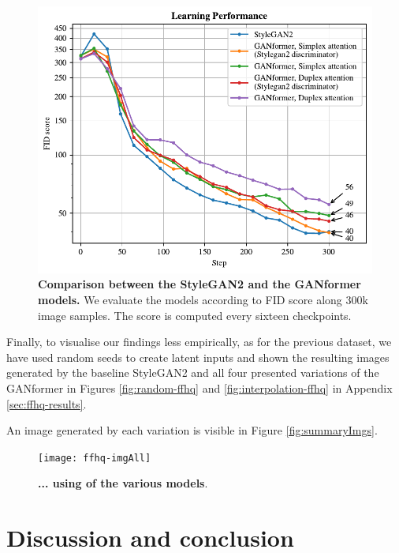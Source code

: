 \documentclass{article}
\begin{document}
\begin{figure}[htpb]				
	\centering
	\includegraphics[width=.7\linewidth]{FIDscore-ffhq.pdf}
	\caption{\textbf{Comparison between the StyleGAN2 and the GANformer models.} We evaluate 
	the models according to FID score along 300k image samples. The score is computed every 
	sixteen checkpoints.}
	\label{fig:performance-ffhq}
\end{figure}

Finally, to visualise our findings less empirically, as for the previous dataset, we have used random seeds to create latent inputs and shown the resulting images generated by the baseline StyleGAN2 and all four presented variations of the GANformer in Figures \ref{fig:random-ffhq} and \ref{fig:interpolation-ffhq} in Appendix \ref{sec:ffhq-results}.

An image generated by each variation is visible in Figure \ref{fig:summaryImgs}.

\begin{figure}[htb]
	\centering
	\texttt{[image: ffhq-imgAll]}
	\caption{\textbf{... using of the various models}.} 
	\label{fig:summaryImgs-ffhq}
\end{figure}

\section{Discussion and conclusion}

%	
\end{document}
